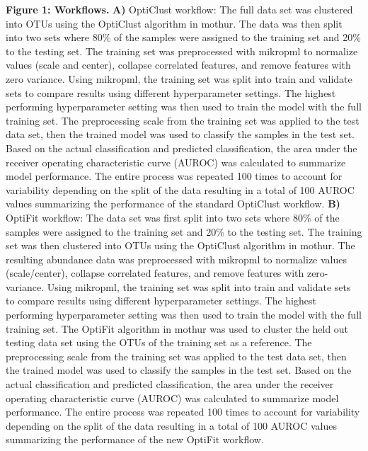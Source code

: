 \documentclass[
]{article}
\begin{document}
\textbf{Figure 1: Workflows.} \textbf{A)} OptiClust workflow: The full
data set was clustered into OTUs using the OptiClust algorithm in
mothur. The data was then split into two sets where 80\% of the samples
were assigned to the training set and 20\% to the testing set. The
training set was preprocessed with mikropml to normalize values (scale
and center), collapse correlated features, and remove features with zero
variance. Using mikropml, the training set was split into train and
validate sets to compare results using different hyperparameter
settings. The highest performing hyperparameter setting was then used to
train the model with the full training set. The preprocessing scale from
the training set was applied to the test data set, then the trained
model was used to classify the samples in the test set. Based on the
actual classification and predicted classification, the area under the
receiver operating characteristic curve (AUROC) was calculated to
summarize model performance. The entire process was repeated 100 times
to account for variability depending on the split of the data resulting
in a total of 100 AUROC values summarizing the performance of the
standard OptiClust workflow. \textbf{B)} OptiFit workflow: The data set
was first split into two sets where 80\% of the samples were assigned to
the training set and 20\% to the testing set. The training set was then
clustered into OTUs using the OptiClust algorithm in mothur. The
resulting abundance data was preprocessed with mikropml to normalize
values (scale/center), collapse correlated features, and remove features
with zero-variance. Using mikropml, the training set was split into
train and validate sets to compare results using different
hyperparameter settings. The highest performing hyperparameter setting
was then used to train the model with the full training set. The OptiFit
algorithm in mothur was used to cluster the held out testing data set
using the OTUs of the training set as a reference. The preprocessing
scale from the training set was applied to the test data set, then the
trained model was used to classify the samples in the test set. Based on
the actual classification and predicted classification, the area under
the receiver operating characteristic curve (AUROC) was calculated to
summarize model performance. The entire process was repeated 100 times
to account for variability depending on the split of the data resulting
in a total of 100 AUROC values summarizing the performance of the new
OptiFit workflow.

\newpage
\end{document}
